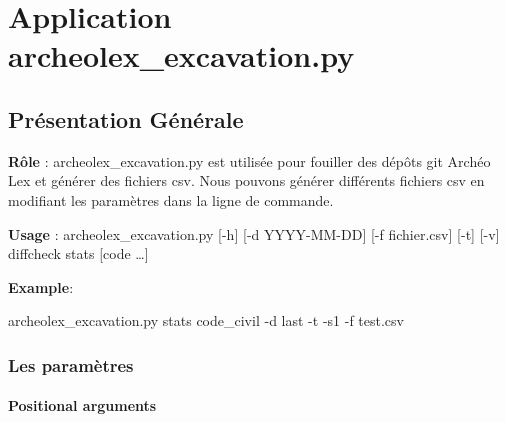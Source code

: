 \documentclass[
  oneside]{book}
\newenvironment{Shaded}{\begin{snugshade}}{\end{snugshade}}
\newcommand{\NormalTok}[1]{#1}
\newcommand{\SpecialCharTok}[1]{\textcolor[rgb]{0.00,0.00,0.00}{#1}}
\begin{document}
\hypertarget{Application}{%
\chapter{Application archeolex\_excavation.py}\label{Application}}

\hypertarget{pruxe9sentation-guxe9nuxe9rale}{%
\section{Présentation Générale}\label{pruxe9sentation-guxe9nuxe9rale}}

\textbf{Rôle} : archeolex\_excavation.py est utilisée pour fouiller des dépôts git Archéo Lex et générer des fichiers csv. Nous pouvons générer différents fichiers csv en modifiant les paramètres dans la ligne de commande.

\textbf{Usage} : archeolex\_excavation.py {[}-h{]} {[}-d YYYY-MM-DD{]} {[}-f fichier.csv{]} {[}-t{]} {[}-v{]} diff\textbar check\textbar{} \textbar stats {[}code \ldots{]}

\textbf{Example}:

\begin{Shaded}
\begin{Highlighting}[]
\NormalTok{archeolex\_excavation.py stats code\_civil }\SpecialCharTok{{-}}\NormalTok{d last }\SpecialCharTok{{-}}\NormalTok{t }\SpecialCharTok{{-}}\NormalTok{s1 }\SpecialCharTok{{-}}\NormalTok{f test.csv}
\end{Highlighting}
\end{Shaded}

\hypertarget{les-paramuxe8tres}{%
\subsection{Les paramètres}\label{les-paramuxe8tres}}

\hypertarget{positional-arguments}{%
\subsubsection{Positional arguments}\label{positional-arguments}}
\end{document}
